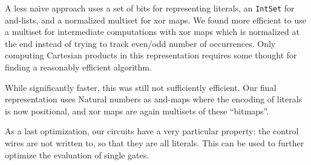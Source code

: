 \documentclass[sigplan,review]{acmart}
\begin{document}
A less na\"{\i}ve approach uses a set of bits for representing literals, an
\texttt{IntSet} for and-lists, and a normalized multiset for xor maps. We found
more efficient to use a multiset for intermediate computations with xor maps
which is normalized at the end instead of trying to track even/odd number of
occurrences. Only computing Cartesian products in this representation requires
some thought for finding a reasonably efficient algorithm.

While significantly faster, this was still not sufficiently efficient. Our final
representation uses Natural numbers as and-maps where the encoding of literals is
now positional, and xor maps are again multisets of these ``bitmaps''.

As a last optimization, our circuits have a very particular property: the control
wires are not written to, so that they are all literals. This can be used to
further optimize the evaluation of single gates.
\end{document}
